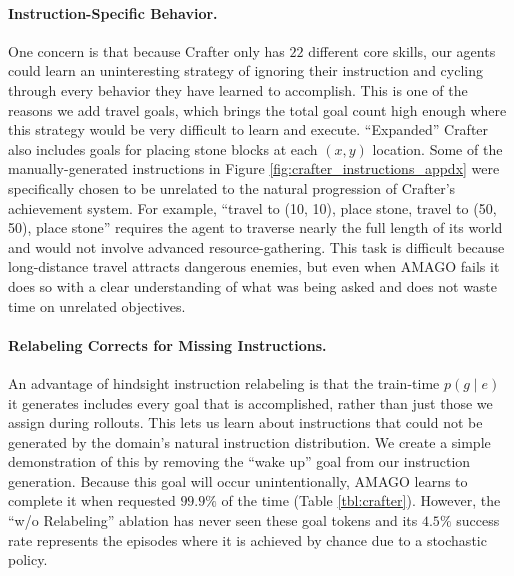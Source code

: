 \paragraph{Instruction-Specific Behavior.} One concern is that because Crafter only has $22$ different core skills, our agents could learn an uninteresting strategy of ignoring their instruction and cycling through every behavior they have learned to accomplish. This is one of the reasons we add travel goals, which brings the total goal count high enough where this strategy would be very difficult to learn and execute. ``Expanded'' Crafter also includes goals for placing stone blocks at each $(x, y)$ location. Some of the manually-generated instructions in Figure \ref{fig:crafter_instructions_appdx} were specifically chosen to be unrelated to the natural progression of Crafter's achievement system. For example, ``travel to (10, 10), place stone, travel to (50, 50), place stone'' requires the agent to traverse nearly the full length of its world and would not involve advanced resource-gathering. This task is difficult because long-distance travel attracts dangerous enemies, but even when AMAGO fails it does so with a clear understanding of what was being asked and does not waste time on unrelated objectives.

\paragraph{Relabeling Corrects for Missing Instructions.} An advantage of hindsight instruction relabeling is that the train-time $p(g \mid e)$ it generates includes every goal that is accomplished, rather than just those we assign during rollouts. This lets us learn about instructions that could not be generated by the domain's natural instruction distribution. We create a simple demonstration of this by removing the ``wake up'' goal from our instruction generation. Because this goal will occur unintentionally, AMAGO learns to complete it when requested $99.9\%$ of the time (Table \ref{tbl:crafter}). However, the ``w/o Relabeling'' ablation has never seen these goal tokens and its $4.5\%$ success rate represents the episodes where it is achieved by chance due to a stochastic policy.

